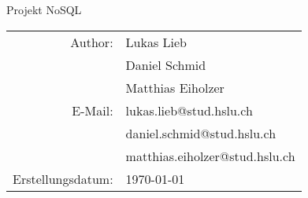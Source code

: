 
\begin{center}
\thispagestyle{empty}

{\huge Projekt NoSQL}\\[1.5cm]


\large
\begin{tabular}{rl}
\hline
Author:  &Lukas Lieb\\ 
				& Daniel Schmid \\
				& Matthias Eiholzer \\

E-Mail: & lukas.lieb@stud.hslu.ch \\
				& daniel.schmid@stud.hslu.ch \\
				& matthias.eiholzer@stud.hslu.ch\\
Erstellungsdatum: & \today\\
\hline
\end{tabular}
\end{center}

